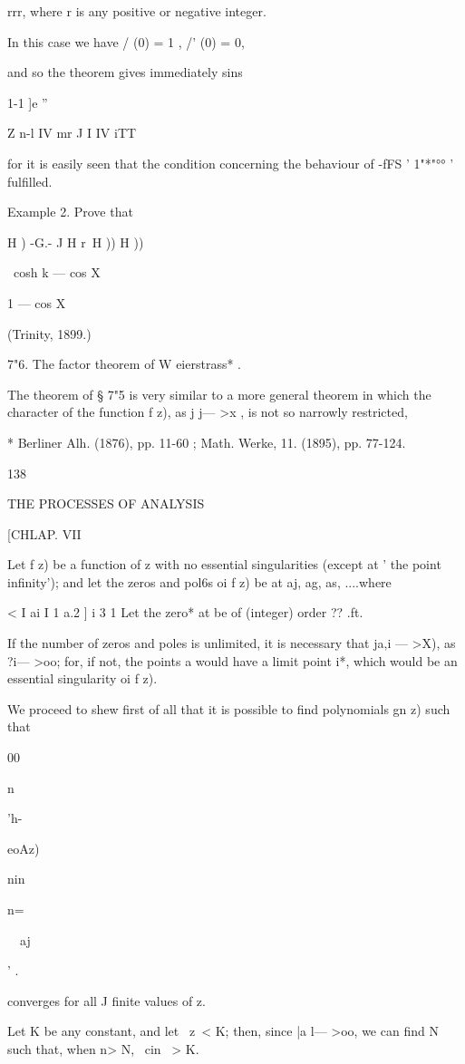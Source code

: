 rrr, where r is any positive or negative integer.

In this case we have / (0) = 1 , /' (0) = 0,

and so the theorem gives immediately sins

1-1 ]e ''

Z n-l IV mr J I IV iTT

for it is easily seen that the condition concerning the behaviour of
-fFS ' 1"*"°° ' fulfilled.

Example 2. Prove that

H ) -G.- J H r\ H )) H ))

\ cosh k — cos X

1 — cos X

(Trinity, 1899.)

7"6. The factor theorem of W eierstrass* .

The theorem of § 7"5 is very similar to a more general theorem in
which the character of the function f z), as j j— >x , is not so
narrowly restricted,

* Berliner Alh. (1876), pp. 11-60 ; Math. Werke, 11. (1895), pp.
77-124.

138

THE PROCESSES OF ANALYSIS

[CHLAP. VII

Let f z) be a function of z with no essential singularities (except at
' the point infinity'); and let the zeros and pol6s oi f z) be at aj,
ag, as, ....where

< I ai I 1 a.2 ] i 3 1 Let the zero* at be of (integer) order ?? .ft.

If the number of zeros and poles is unlimited, it is necessary that
ja,i — >X), as ?i— >oo; for, if not, the points a would have a limit
point i*, which would be an essential singularity oi f z).

We proceed to shew first of all that it is possible to find
polynomials gn z) such that

00

n

'h-~\

eoAz)

nin

n=\

\ \ aj

' .

converges for all J finite values of z.

Let K be any constant, and let \ z\ < K; then, since |a l— >oo, we can
find N such that, when n> N, \ cin \ > K.

